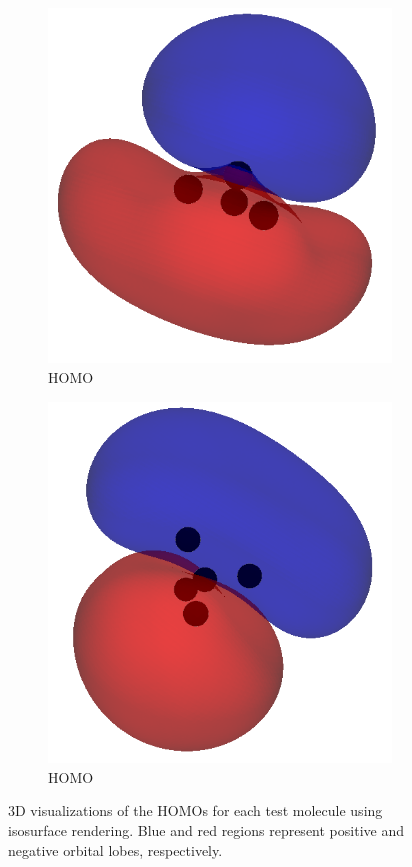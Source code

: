 \documentclass[12pt]{article}
\begin{document}
\begin{figure}[H]
    \begin{subfigure}[b]{0.45\textwidth}
        \includegraphics[width=\textwidth]{figures/nh3_homo.png}
        \caption{ HOMO}
    \end{subfigure}
    \hfill
    \begin{subfigure}[b]{0.45\textwidth}
        \includegraphics[width=\textwidth]{figures/ch4_homo.png}
        \caption{ HOMO}
    \end{subfigure}

    \caption{3D visualizations of the HOMOs for each test molecule using isosurface rendering. Blue and red regions represent positive and negative orbital lobes, respectively.}
\end{figure}
\end{document}
